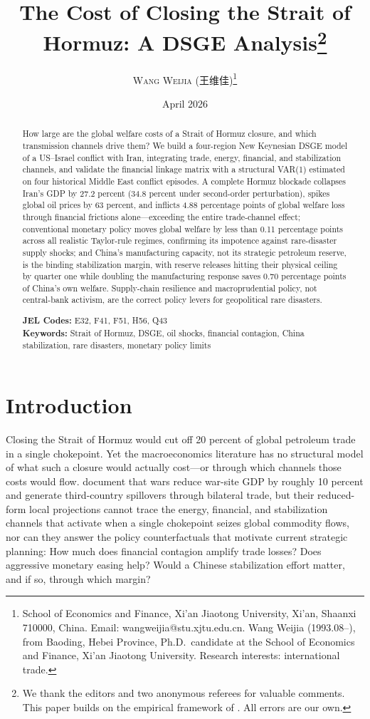 \documentclass[12pt]{article}
\title{\textbf{The Cost of Closing the Strait of Hormuz: A DSGE Analysis}\thanks{We thank the editors and two anonymous referees for valuable comments. This paper builds on the empirical framework of \citet{federle2026price}. All errors are our own.}}
\author{
  \textsc{Wang Weijia} (王维佳)\thanks{School of Economics and Finance, Xi'an Jiaotong University, Xi'an, Shaanxi 710000, China. Email: wangweijia@stu.xjtu.edu.cn. Wang Weijia (1993.08--), from Baoding, Hebei Province, Ph.D.\ candidate at the School of Economics and Finance, Xi'an Jiaotong University. Research interests: international trade.}
}
\date{April 2026}
\begin{document}
\maketitle

\begin{abstract}
\noindent
How large are the global welfare costs of a Strait of Hormuz closure, and which transmission channels drive them? We build a four-region New Keynesian DSGE model of a US--Israel conflict with Iran, integrating trade, energy, financial, and stabilization channels, and validate the financial linkage matrix with a structural VAR(1) estimated on four historical Middle East conflict episodes. A complete Hormuz blockade collapses Iran's GDP by 27.2 percent (34.8 percent under second-order perturbation), spikes global oil prices by 63 percent, and inflicts 4.88 percentage points of global welfare loss through financial frictions alone---exceeding the entire trade-channel effect; conventional monetary policy moves global welfare by less than 0.11 percentage points across all realistic Taylor-rule regimes, confirming its impotence against rare-disaster supply shocks; and China's manufacturing capacity, not its strategic petroleum reserve, is the binding stabilization margin, with reserve releases hitting their physical ceiling by quarter one while doubling the manufacturing response saves 0.70 percentage points of China's own welfare. Supply-chain resilience and macroprudential policy, not central-bank activism, are the correct policy levers for geopolitical rare disasters.

\bigskip
\noindent \textbf{JEL Codes:} E32, F41, F51, H56, Q43 \\
\noindent \textbf{Keywords:} Strait of Hormuz, DSGE, oil shocks, financial contagion, China stabilization, rare disasters, monetary policy limits
\end{abstract}

\thispagestyle{empty}
\newpage
\setcounter{page}{1}



\section{Introduction}

Closing the Strait of Hormuz would cut off 20 percent of global petroleum trade in a single chokepoint. Yet the macroeconomics literature has no structural model of what such a closure would actually cost---or through which channels those costs would flow. \citet{federle2026price} document that wars reduce war-site GDP by roughly 10 percent and generate third-country spillovers through bilateral trade, but their reduced-form local projections cannot trace the energy, financial, and stabilization channels that activate when a single chokepoint seizes global commodity flows, nor can they answer the policy counterfactuals that motivate current strategic planning: How much does financial contagion amplify trade losses? Does aggressive monetary easing help? Would a Chinese stabilization effort matter, and if so, through which margin?
\end{document}
